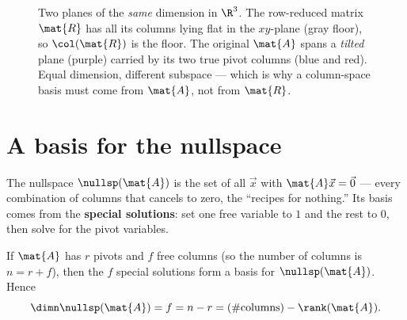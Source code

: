 \begin{figure}[H]
\centering
{}
\caption{Two planes of the \emph{same} dimension in $\R^3$. The row-reduced
matrix $\mat{R}$ has all its columns lying flat in the $xy$-plane (gray floor),
so $\col(\mat{R})$ is the floor. The original $\mat{A}$ spans a \emph{tilted}
plane (purple) carried by its two true pivot columns (blue and red). Equal
dimension, different subspace --- which is why a column-space basis must come
from $\mat{A}$, not from $\mat{R}$.}
\label{ch14:fig-tilted}
\end{figure}

\section{A basis for the nullspace}
\label{ch14:nullbasis}

The nullspace $\nullsp(\mat{A})$ is the set of all $\vec{x}$ with $\mat{A}\vec{x}
= \vec{0}$ --- every combination of columns that cancels to zero, the ``recipes
for nothing.'' Its basis comes from the \textbf{special solutions}: set one free
variable to $1$ and the rest to $0$, then solve for the pivot variables.

\begin{theorem}
\label{ch14:thm-nullbasis}
If $\mat{A}$ has $r$ pivots and $f$ free columns (so the number of columns is $n =
r + f$), then the $f$ special solutions form a basis for $\nullsp(\mat{A})$. Hence
\[
  \dimn\nullsp(\mat{A}) = f = n - r = (\#\text{columns}) - \rank(\mat{A}).
\]
\end{theorem}

